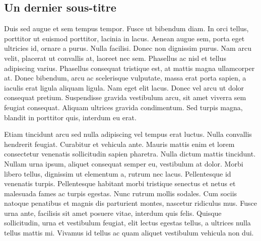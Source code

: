 \subsection{Un dernier sous-titre}

Duis sed augue et sem tempus tempor. Fusce ut bibendum diam. In orci tellus,
porttitor ut euismod porttitor, lacinia in lacus. Aenean augue sem, porta
eget ultricies id, ornare a purus. Nulla facilisi. Donec non dignissim
purus. Nam arcu velit, placerat ut convallis at, laoreet nec sem. Phasellus
ac nisl et tellus adipiscing varius. Phasellus consequat tristique est, at
mattis magna ullamcorper at. Donec bibendum, arcu ac scelerisque vulputate,
massa erat porta sapien, a iaculis erat ligula aliquam ligula. Nam eget elit
lacus. Donec vel arcu ut dolor consequat pretium. Suspendisse gravida
vestibulum arcu, sit amet viverra sem feugiat consequat. Aliquam ultrices
gravida condimentum. Sed turpis magna, blandit in porttitor quis, interdum
eu erat.

Etiam tincidunt arcu sed nulla adipiscing vel tempus erat luctus. Nulla
convallis hendrerit feugiat. Curabitur et vehicula ante. Mauris mattis enim
et lorem consectetur venenatis sollicitudin sapien pharetra. Nulla dictum
mattis tincidunt. Nullam urna ipsum, aliquet consequat semper eu, vestibulum
at dolor. Morbi libero tellus, dignissim ut elementum a, rutrum nec lacus.
Pellentesque id venenatis turpis. Pellentesque habitant morbi tristique
senectus et netus et malesuada fames ac turpis egestas. Nunc rutrum mollis
sodales. Cum sociis natoque penatibus et magnis dis parturient montes,
nascetur ridiculus mus. Fusce urna ante, facilisis sit amet posuere vitae,
interdum quis felis. Quisque sollicitudin, urna et vestibulum feugiat, elit
lectus egestas tellus, a ultrices nulla tellus mattis mi. Vivamus id tellus
ac quam aliquet vestibulum vehicula non dui.
